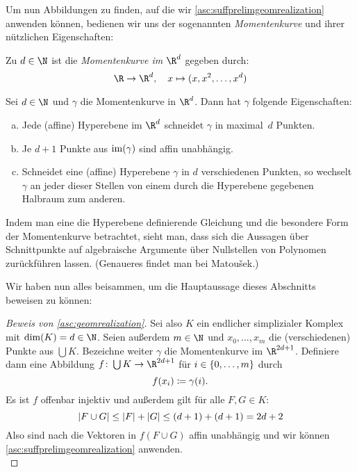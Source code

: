Um nun Abbildungen zu finden, auf die wir \cref{asc:suffprelimgeomrealization}
anwenden können, bedienen wir uns der sogenannten \emph{Momentenkurve} und ihrer
nützlichen Eigenschaften:

\begin{thDef}[Momentenkurve]
    Zu $d\in\N$ ist die \emph{Momentenkurve im $\R^d$} gegeben durch:
    \[  \R \to \R^d, \quad x\mapsto (x,x^2,\ldots,x^d) \]
\end{thDef}

\begin{thLemma}
    \label{asc:momentumcurveprop}
    Sei $d\in\N$ und $\gamma$ die Momentenkurve in $\R^d$. Dann hat $\gamma$
    folgende Eigenschaften:
    \begin{enumerate}[a)]
        \item
            Jede (affine) Hyperebene im $\R^d$ schneidet $\gamma$ 
            in maximal~$d$ Punkten.
        \item\label{asc:momentumcurveprop:pointsaffinlyindependent}
            Je $d+1$ Punkte aus $\operatorname{im}(\gamma)$ sind affin unabhängig.
        \item
            Schneidet eine (affine) Hyperebene $\gamma$ in $d$ verschiedenen 
            Punkten, so wechselt $\gamma$ an jeder dieser Stellen von einem
            durch die Hyperebene gegebenen Halbraum zum anderen.
    \end{enumerate}
\end{thLemma}

\begin{proofsketch}
    Indem man eine die Hyperebene definierende Gleichung und die besondere Form
    der Momentenkurve betrachtet, sieht man, dass sich die Aussagen über
    Schnittpunkte auf algebraische Argumente über Nullstellen von Polynomen
    zurückführen lassen. (Genaueres findet man bei 
    Matou\v sek\cite[Ch.\,1,.4]{bookc:matousek03}.)
    \\
\end{proofsketch}

Wir haben nun alles beisammen, um die Hauptaussage dieses Abschnitts beweisen zu
können:
\begin{proof}[Beweis von \cref{asc:geomrealization}]
    Sei also $K$ ein endlicher simplizialer Komplex mit $\dim(K)=d\in\N$.
    Seien außerdem $m\in\N$ und $x_0,\ldots,x_m$ die (verschiedenen) Punkte
    aus $\bigcup K$. Bezeichne weiter $\gamma$ die Momentenkurve im $\R^{2d+1}$.
    Definiere dann eine Abbildung
    $f\colon \bigcup K\to\R^{2d+1}$ für $i\in\{0,\ldots,m\}$ durch 
    \[ f(x_i) \coloneqq \gamma(i) 
    . \]
    Es ist $f$ offenbar injektiv und außerdem gilt für alle $F,G\in K$:
    \[ \lvert F\cup G\rvert \leq \lvert F\rvert+\lvert G\rvert \leq (d+1)+(d+1) = 2d+2 \]
    Also sind nach 
    die Vektoren in $f(F\cup G)$ affin unabhängig und wir können
    \cref{asc:suffprelimgeomrealization} anwenden.
    \\
\end{proof}


